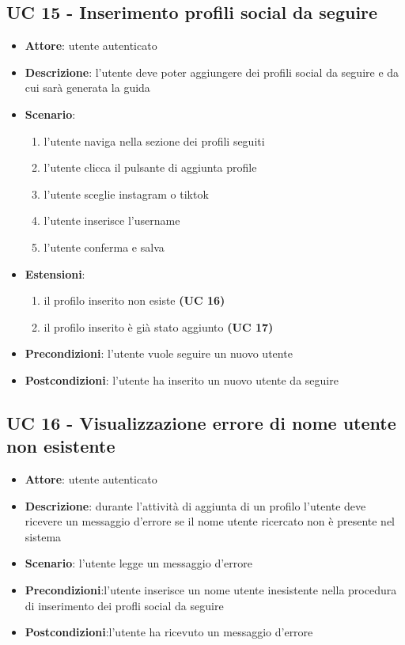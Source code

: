 \subsection{UC 15 - Inserimento profili social da seguire}
\begin{itemize}
    \item \textbf{Attore}: utente autenticato
    \item \textbf{Descrizione}: l’utente deve poter aggiungere dei profili social da seguire e da cui sarà generata la guida
    \item \textbf{Scenario}: 
        \begin{enumerate}
            \item l’utente naviga nella sezione dei profili seguiti
            \item l’utente clicca il pulsante di aggiunta profile
            \item l’utente sceglie instagram o tiktok
            \item l’utente inserisce l’username
            \item l’utente conferma e salva
        \end{enumerate}
    \item \textbf{Estensioni}:
        \begin{enumerate}
            \item il profilo inserito non esiste \textbf{(UC 16)}
            \item il profilo inserito è già stato aggiunto \textbf{(UC 17)}
        \end{enumerate}
    \item \textbf{Precondizioni}: l’utente vuole seguire un nuovo utente
    \item \textbf{Postcondizioni}: l’utente ha inserito un nuovo utente da seguire
\end{itemize}


\subsection{UC 16 - Visualizzazione errore di nome utente non esistente}
\begin{itemize}
    \item \textbf{Attore}: utente autenticato
    \item \textbf{Descrizione}: durante l’attività di aggiunta di un profilo l’utente deve ricevere un messaggio d’errore se il nome utente ricercato non è presente nel sistema
    \item \textbf{Scenario}: l’utente legge un messaggio d’errore
    \item \textbf{Precondizioni}:l’utente inserisce un nome utente inesistente nella procedura di inserimento dei profli social da seguire
    \item \textbf{Postcondizioni}:l’utente ha ricevuto un messaggio d’errore
\end{itemize}

